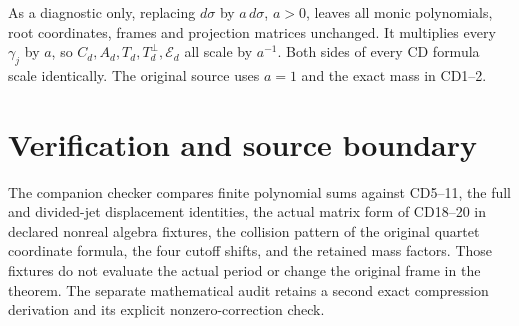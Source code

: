 \documentclass[11pt]{article}
\begin{document}
As a diagnostic only, replacing \(d\sigma\) by \(a\,d\sigma\),
\(a>0\), leaves all monic polynomials, root coordinates, frames and
projection matrices unchanged. It multiplies every \(\gamma_j\) by
\(a\), so \(C_d,A_d,T_d,T_d^\perp,\mathcal E_d\) all scale by
\(a^{-1}\). Both sides of every CD formula scale identically.
The original source uses \(a=1\) and the exact mass in CD1--2.

\section{Verification and source boundary}

The companion checker compares finite polynomial sums against CD5--11,
the full and divided-jet displacement identities, the actual matrix
form of CD18--20 in declared nonreal algebra fixtures, the collision
pattern of the original quartet coordinate formula, the four cutoff
shifts, and the retained mass factors. Those fixtures do not evaluate
the actual period or change the original frame in the theorem.
The separate mathematical audit retains a second exact compression
derivation and its explicit nonzero-correction check.
\end{document}

